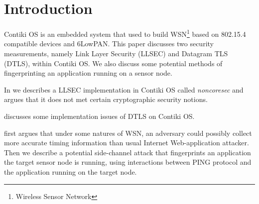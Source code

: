 \chapter{Introduction}
Contiki OS is an embedded system that used to build WSN\footnote{Wireless Sensor Network} based on 802.15.4\cite{802154} compatible devices and 6LowPAN\cite{rfc4944}. This paper discusses two security measurements, namely Link Layer Security (LLSEC) and Datagram TLS (DTLS), within Contiki OS. We also discuss some potential methods of fingerprinting an application running on a sensor node.

In  we describes a LLSEC implementation in Contiki OS called \textit{noncoresec} and argues that it does not met certain cryptographic security notions.

 discusses some implementation issues of DTLS on Contiki OS.

 first argues that under some natures of WSN, an adversary could possibly collect more accurate timing information than usual Internet Web-application attacker. Then we describe a potential side-channel attack that fingerprints an application the target sensor node is running, using interactions between PING protocol and the application running on the target node.